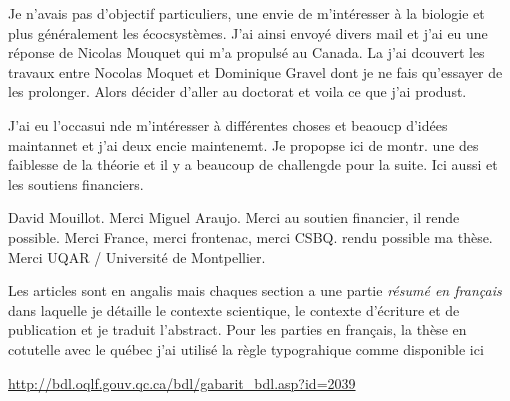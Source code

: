 Je n'avais pas d'objectif particuliers, une envie de m'intéresser à la
biologie et plus généralement les écocsystèmes. J'ai ainsi envoyé divers
mail et j'ai eu une réponse de Nicolas Mouquet qui m'a propulsé au
Canada. La j'ai dcouvert les travaux entre Nocolas Moquet et Dominique
Gravel dont je ne fais qu'essayer de les prolonger. Alors décider
d'aller au doctorat et voila ce que j'ai produst.

J'ai eu l'occasui nde m'intéresser à différentes choses et beaoucp
d'idées maintannet et j'ai deux encie maintenemt. Je propopse ici de
montr. une des faiblesse de la théorie et il y a beaucoup de challengde
pour la suite. Ici aussi et les soutiens financiers.

David Mouillot. Merci Miguel Araujo. Merci au soutien financier, il
rende possible. Merci France, merci frontenac, merci CSBQ. rendu
possible ma thèse. Merci UQAR / Université de Montpellier.

Les articles sont en angalis mais chaques section a une partie
\emph{résumé en français} dans laquelle je détaille le contexte
scientique, le contexte d'écriture et de publication et je traduit
l'abstract. Pour les parties en français, la thèse en cotutelle avec le
québec j'ai utilisé la règle typograhique comme disponible ici

\url{http://bdl.oqlf.gouv.qc.ca/bdl/gabarit_bdl.asp?id=2039}
